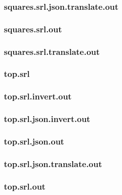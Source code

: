 \subsubsection{squares.srl.json.translate.out}
\label{app:squares_srl.json.translate.out}

\subsubsection{squares.srl.out}
\label{app:squares_srl.out}

\subsubsection{squares.srl.translate.out}
\label{app:squares_srl.translate.out}

\subsubsection{top.srl}
\label{app:top_srl}

\subsubsection{top.srl.invert.out}
\label{app:top_srl.invert.out}

\subsubsection{top.srl.json.invert.out}
\label{app:top_srl.json.invert.out}

\subsubsection{top.srl.json.out}
\label{app:top_srl.json.out}

\subsubsection{top.srl.json.translate.out}
\label{app:top_srl.json.translate.out}

\subsubsection{top.srl.out}
\label{app:top_srl.out}

